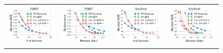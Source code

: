 \begin{figure}
	\centering
	\begin{small}
	\begin{tabular}{@{\hskip -0.05in}c@{\hskip -0.1in}c@{\hskip -0.1in}c@{\hskip -0.1in}c@{\hskip -0.05in}}
		\includegraphics[width=0.26\linewidth]{figures/timit_error_vs_n_feat.pdf} &
		\includegraphics[width=0.26\linewidth]{figures/timit_error_vs_n_memory.pdf} &
		\includegraphics[width=0.26\linewidth]{figures/yearpred_MSE_vs_n_feat.pdf} & 
		\includegraphics[width=0.26\linewidth]{figures/yearpred_MSE_vs_n_memory.pdf}
\\

\end{tabular}
\end{small}
\end{figure}

